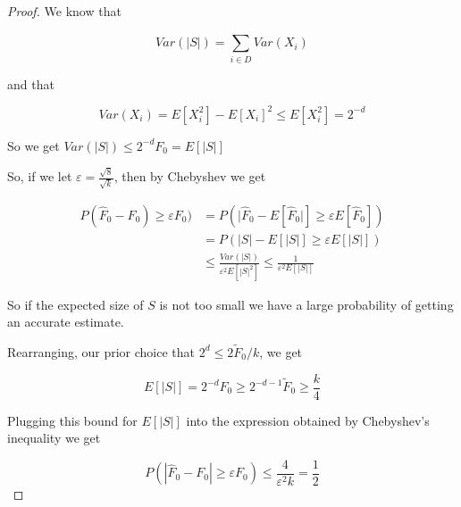\documentclass[../notes.tex]{subfiles}
\begin{document}
\begin{theorem}
\begin{proof}
    We know that 

    \begin{equation}
        Var(|S|) = \sum_{i \in D}^{} Var(X_i)
    \end{equation}

    and that

    \begin{equation}
        Var(X_i) = E[X_i^2] - E[X_i]^2 \le  E[X_i^2] = 2^{-d}
    \end{equation}

    So we get $ Var(|S|) \le 2^{-d} F_0 = E[|S|] $

    So, if we let $ \varepsilon = \frac{\sqrt{8}}{\sqrt{k}} $, then by Chebyshev we get

    \begin{equation}
        \begin{split}
            P(\hat{F}_0 - F_0) \ge \varepsilon F_0) &= P(|\hat{F}_0 - E[\hat{F}_0|] \ge  \varepsilon E[\hat{F}_0]) \\
                                                    &= P(|S| - E[|S|] \ge  \varepsilon E[|S|]) \\
                                                    &\le \frac{Var(|S|)}{\varepsilon^2 E[|S|^2]} \le  \frac{1}{\varepsilon^2 E[|S|]}
        \end{split}
    \end{equation}

    So if the expected size of $ S $ is not too small we have a large probability of getting an accurate estimate.

    Rearranging, our prior choice that $ 2^d \le  2 \tilde{F}_0 /k $, we get 

    \begin{equation}
        E[|S|] = 2^{-d} F_0 \ge  2^{-d-1} \tilde{F}_0 \ge  \frac{k}{4}
    \end{equation} 

    Plugging this bound for $ E[|S|] $ into the expression obtained by Chebyshev's inequality we get 

    \begin{equation}
        P( |\hat{F}_0 - F_0 | \ge  \varepsilon F_0) \le  \frac{4}{\varepsilon^2 k} = \frac{1}{2}
    \end{equation}
    
\end{proof}
    
\end{theorem}
\end{document}
